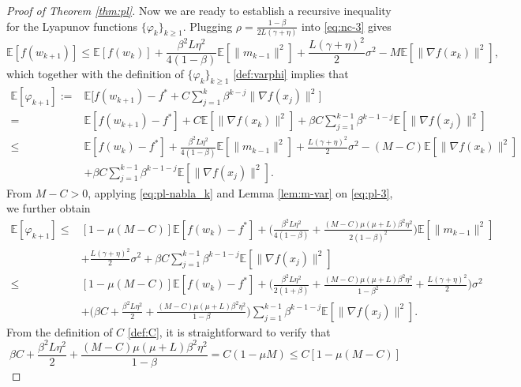 \documentclass[10pt]{article}
\numberwithin{equation}{section}
\theoremstyle{definition}
\newcommand{\ebb}{\mathbb{E}}  %
\begin{document}
\begin{proof}[Proof of Theorem \ref{thm:pl}]
Now we are ready to establish a recursive inequality for the Lyapunov functions $\{\varphi_k\}_{k\ge 1}$. Plugging $\rho=\frac{1-\beta}{2 L(\gamma+\eta)}$ into \eqref{eq:nc-3} gives
\[
\ebb[f(w_{k+1})] \leq \ebb[f(w_k)]+\frac{\beta^2 L \eta^2}{4(1-\beta)} \ebb[\|m_{k-1}\|^2]+\frac{L(\gamma+\eta)^2}{2} \sigma^2-M \ebb[\|\nabla f(x_k)\|^2],
\]
which together with the definition of $\{\varphi_k\}_{k\ge 1}$ \eqref{def:varphi} implies that
\begin{equation}\label{eq:pl-3}
\begin{aligned}
\ebb[\varphi_{k+1}]:=&\ebb\Big[f(w_{k+1})-f^*+C \sum_{j=1}^k \beta^{k-j}\|\nabla f(x_j)\|^2\Big]\\
=&\ebb[f(w_{k+1})-f^*]+C \ebb[\|\nabla f(x_k)\|^2]+\beta C \sum_{j=1}^{k-1} \beta^{k-1-j} \ebb[\|\nabla f(x_j)\|^2] \\
\leq & \ebb[f(w_k)-f^*]+\frac{\beta^2 L \eta^2}{4(1-\beta)} \ebb[\|m_{k-1}\|^2]+\frac{L(\gamma+\eta)^2}{2} \sigma^2-(M-C) \ebb[\|\nabla f(x_k)\|^2]\\
&+\beta C \sum_{j=1}^{k-1} \beta^{k-1-j} \ebb[\|\nabla f(x_j)\|^2].
\end{aligned}
\end{equation}
From $M-C>0$, applying \eqref{eq:pl-nabla_k} and Lemma \ref{lem:m-var} on \eqref{eq:pl-3}, we further obtain
\begin{equation}\label{eq:pl-4}
\begin{aligned}
\ebb[\varphi_{k+1}] \leq& [1-\mu(M-C)] \ebb[f(w_k)-f^*]+\Big(\frac{\beta^2 L \eta^2}{4(1-\beta)}+\frac{(M-C) \mu(\mu+L) \beta^2 \eta^2}{2(1-\beta)^2}\Big) \ebb[\|m_{k-1}\|^2] \\
&+\frac{L(\gamma+\eta)^2}{2} \sigma^2+\beta C \sum_{j=1}^{k-1} \beta^{k-1-j} \ebb[\|\nabla f(x_j)\|^2]\\
\leq & [1-\mu(M-C)] \ebb[f(w_k)-f^*]+\Big(\frac{\beta^2 L \eta^2}{2(1+\beta)}+\frac{(M-C) \mu(\mu+L) \beta^2 \eta^2}{1-\beta^2}+\frac{L(\gamma+ \eta)^2}{2}\Big) \sigma^2 \\
& +\Big(\beta C+\frac{\beta^2 L \eta^2}{2}+\frac{(M-C) \mu(\mu+L) \beta^2 \eta^2}{1-\beta}\Big) \sum_{j=1}^{k-1} \beta^{k-1-j} \ebb[\|\nabla f(x_j)\|^2].
\end{aligned}
\end{equation}
From the definition of $C$ \eqref{def:C}, it is straightforward to verify that
\begin{equation}\label{eq:pl-5}
\beta C+\frac{\beta^2 L \eta^2}{2}+\frac{(M-C) \mu(\mu+L) \beta^2 \eta^2}{1-\beta} = C(1-\mu M)\leq C[1-\mu(M-C)]
\end{equation}

\end{proof}
\end{document}
